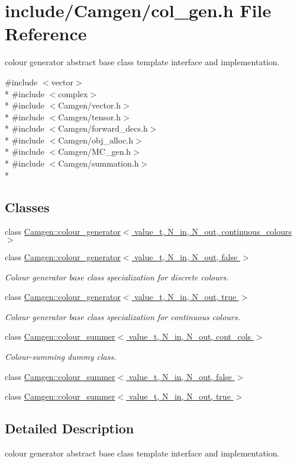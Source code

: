 \hypertarget{a00612}{}\section{include/\+Camgen/col\+\_\+gen.h File Reference}
\label{a00612}


colour generator abstract base class template interface and implementation.  


{\ttfamily \#include $<$vector$>$}\\*
{\ttfamily \#include $<$complex$>$}\\*
{\ttfamily \#include $<$Camgen/vector.\+h$>$}\\*
{\ttfamily \#include $<$Camgen/tensor.\+h$>$}\\*
{\ttfamily \#include $<$Camgen/forward\+\_\+decs.\+h$>$}\\*
{\ttfamily \#include $<$Camgen/obj\+\_\+alloc.\+h$>$}\\*
{\ttfamily \#include $<$Camgen/\+M\+C\+\_\+gen.\+h$>$}\\*
{\ttfamily \#include $<$Camgen/summation.\+h$>$}\\*
\subsection*{Classes}
\begin{DoxyCompactItemize}
\item 
class \hyperlink{a00077}{Camgen\+::colour\+\_\+generator$<$ value\+\_\+t, N\+\_\+in, N\+\_\+out, continuous\+\_\+colours $>$}
\item 
class \hyperlink{a00078}{Camgen\+::colour\+\_\+generator$<$ value\+\_\+t, N\+\_\+in, N\+\_\+out, false $>$}
\begin{DoxyCompactList}\small\item\em Colour generator base class specialization for discrete colours. \end{DoxyCompactList}\item 
class \hyperlink{a00079}{Camgen\+::colour\+\_\+generator$<$ value\+\_\+t, N\+\_\+in, N\+\_\+out, true $>$}
\begin{DoxyCompactList}\small\item\em Colour generator base class specialization for continuous colours. \end{DoxyCompactList}\item 
class \hyperlink{a00087}{Camgen\+::colour\+\_\+summer$<$ value\+\_\+t, N\+\_\+in, N\+\_\+out, cont\+\_\+cols $>$}
\begin{DoxyCompactList}\small\item\em Colour-\/summing dummy class. \end{DoxyCompactList}\item 
class \hyperlink{a00088}{Camgen\+::colour\+\_\+summer$<$ value\+\_\+t, N\+\_\+in, N\+\_\+out, false $>$}
\item 
class \hyperlink{a00089}{Camgen\+::colour\+\_\+summer$<$ value\+\_\+t, N\+\_\+in, N\+\_\+out, true $>$}
\end{DoxyCompactItemize}


\subsection{Detailed Description}
colour generator abstract base class template interface and implementation. 

